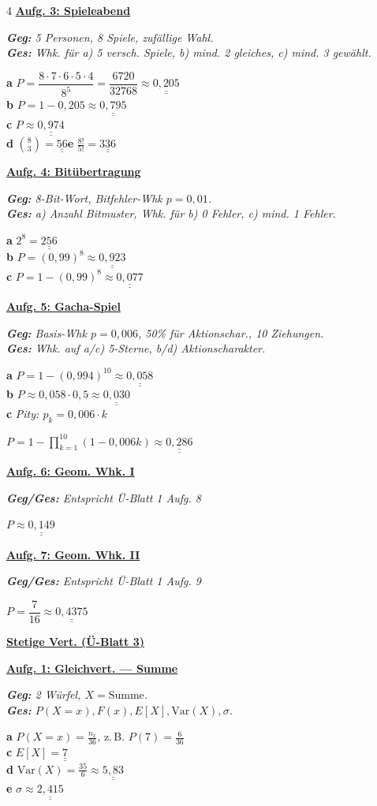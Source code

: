 \documentclass[landscape,a4paper,8pt]{article}
\newcommand{\aufgabe}[1]{\vspace{1pt}\textbf{\underline{#1}}\par}
\newcommand{\blatt}[1]{\smallskip\begin{center}\textbf{\normalsize\underline{#1}}\end{center}\par}
\newcommand{\teil}[1]{\textbf{#1}\;}
\newcommand{\erkl}[1]{{\small\textit{#1}}\par}
\newcommand{\erg}[1]{\underline{\underline{#1}}}
\begin{document}
\begin{multicols*}{4}
\aufgabe{Aufg. 3: Spieleabend}
\erkl{\textbf{Geg:} 5 Personen, 8 Spiele, zufällige Wahl.\\\textbf{Ges:} Whk. für a) 5 versch. Spiele, b) mind. 2 gleiches, c) mind. 3 gewählt.}
\teil{a} $P=\dfrac{8\cdot7\cdot6\cdot5\cdot4}{8^5}=\dfrac{6720}{32768}\approx\erg{0{,}205}$\\
\teil{b} $P=1-0{,}205\approx\erg{0{,}795}$\\
\teil{c} $P\approx\erg{0{,}974}$\\
\teil{d} $\binom{8}{3}=\erg{56}$\quad\teil{e} $\frac{8!}{5!}=\erg{336}$

\aufgabe{Aufg. 4: Bitübertragung}
\erkl{\textbf{Geg:} 8-Bit-Wort, Bitfehler-Whk $p=0{,}01$.\\\textbf{Ges:} a) Anzahl Bitmuster, Whk. für b) 0 Fehler, c) mind. 1 Fehler.}
\teil{a} $2^8=\erg{256}$\\
\teil{b} $P=(0{,}99)^8\approx\erg{0{,}923}$\\
\teil{c} $P=1-(0{,}99)^8\approx\erg{0{,}077}$

\aufgabe{Aufg. 5: Gacha-Spiel}
\erkl{\textbf{Geg:} Basis-Whk $p=0{,}006$, 50\% für Aktionschar., 10 Ziehungen.\\\textbf{Ges:} Whk. auf a/c) 5-Sterne, b/d) Aktionscharakter.}
\teil{a} $P=1-(0{,}994)^{10}\approx\erg{0{,}058}$\\
\teil{b} $P\approx0{,}058\cdot0{,}5\approx\erg{0{,}030}$\\
\teil{c} \erkl{Pity: $p_k=0{,}006\cdot k$}
$P=1-\prod_{k=1}^{10}(1-0{,}006k)\approx\erg{0{,}286}$

\aufgabe{Aufg. 6: Geom. Whk. I}
\erkl{\textbf{Geg/Ges:} Entspricht Ü-Blatt 1 Aufg. 8}
$P\approx\erg{0{,}149}$

\aufgabe{Aufg. 7: Geom. Whk. II}
\erkl{\textbf{Geg/Ges:} Entspricht Ü-Blatt 1 Aufg. 9}
$P=\dfrac{7}{16}\approx\erg{0{,}4375}$

\columnbreak
\blatt{Stetige Vert. (Ü-Blatt 3)}

\aufgabe{Aufg. 1: Gleichvert. — Summe}
\erkl{\textbf{Geg:} 2 Würfel, $X = \text{Summe}$.\\\textbf{Ges:} $P(X{=}x), F(x), E[X], \mathrm{Var}(X), \sigma$.}
\teil{a} $P(X{=}x)=\frac{n_x}{36}$, z.\,B. $P(7)=\frac{6}{36}$\\
\teil{c} $E[X]=\erg{7}$\\
\teil{d} $\mathrm{Var}(X)=\frac{35}{6}\approx\erg{5{,}83}$\\
\teil{e} $\sigma\approx\erg{2{,}415}$


\end{multicols*}
\end{document}
